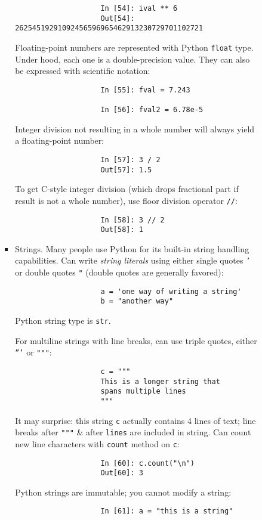 \documentclass{article}
\begin{document}
\begin{itemize}
\begin{itemize}
\begin{itemize}
\begin{itemize}
\begin{verbatim}
					In [54]: ival ** 6
					Out[54]: 26254519291092456596965462913230729701102721
				\end{verbatim}
				Floating-point numbers are represented with Python {\tt float} type. Under hood, each one is a double-precision value. They can also be expressed with scientific notation:
				\begin{verbatim}
					In [55]: fval = 7.243
					
					In [56]: fval2 = 6.78e-5
				\end{verbatim}
				Integer division not resulting in a whole number will always yield a floating-point number:
				\begin{verbatim}
					In [57]: 3 / 2
					Out[57]: 1.5
				\end{verbatim}
				To get C-style integer division (which drops fractional part if result is not a whole number), use floor division operator {\tt//}:
				\begin{verbatim}
					In [58]: 3 // 2
					Out[58]: 1
				\end{verbatim}
				\item {\sf Strings.} Many people use Python for its built-in string handling capabilities. Can write {\it string literals} using either single quotes {\tt'} or double quotes {\tt"} (double quotes are generally favored):
				\begin{verbatim}
					a = 'one way of writing a string'
					b = "another way"
				\end{verbatim}
				Python string type is {\tt str}.
				
				For multiline strings with line breaks, can use triple quotes, either {\tt'''} or {\tt"""}:
				\begin{verbatim}
					c = """
					This is a longer string that
					spans multiple lines
					"""
				\end{verbatim}
				It may surprise: this string {\tt c} actually contains 4 lines of text; line breaks after {\tt"""} \& after {\tt lines} are included in string. Can count new line characters with {\tt count} method on {\tt c}:
				\begin{verbatim}
					In [60]: c.count("\n")
					Out[60]: 3
				\end{verbatim}
				Python strings are immutable; you cannot modify a string:
				\begin{verbatim}
					In [61]: a = "this is a string"
					

\end{verbatim}
\end{itemize}
\end{itemize}
\end{itemize}
\end{itemize}
\end{document}
